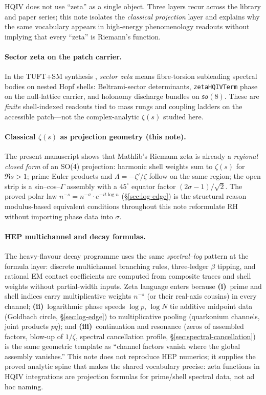 \documentclass[11pt]{amsart}
\begin{document}
HQIV does not use ``zeta'' as a single object.  Three layers recur across the
library and paper series; this note isolates the \emph{classical projection}
layer and explains why the same vocabulary appears in high-energy phenomenology
readouts without implying that every ``zeta'' is Riemann's function.

\paragraph{Sector zeta on the patch carrier.}
In the TUFT+SM synthesis \cite{hqiv-tuft-sm-lagrangian-paper}, \emph{sector
zeta} means fibre-torsion subleading spectral bodies on nested Hopf shells:
Beltrami-sector determinants, \texttt{zetaHQIVTerm} phase on the null-lattice
carrier, and holonomy discharge bundles on $\mathfrak{so}(8)$.  These are
\emph{finite} shell-indexed readouts tied to mass rungs and coupling ladders on
the accessible patch---not the complex-analytic $\zeta(s)$ studied here.

\paragraph{Classical $\zeta(s)$ as projection geometry (this note).}
The present manuscript shows that Mathlib's Riemann zeta is already a
\emph{regional closed form} of an SO(4) projection: harmonic shell weights sum
to $\zeta(s)$ for $\Re s>1$; prime Euler products and $\Lambda=-\zeta'/\zeta$
follow on the same region; the open strip is a sin--cos--$\Gamma$ assembly with
a $45^\circ$ equator factor $(2\sigma-1)/\sqrt2$.  The proved polar law
$n^{-s}=n^{-\sigma}\cdot e^{-it\log n}$ (\S\ref{sec:log-edge}) is the
structural reason modulus-based equivalent conditions throughout this note
reformulate RH
without importing phase data into $\sigma$.

\paragraph{HEP multichannel and decay formulas.}
The heavy-flavour decay programme \cite{hqiv-hep-decay-paper} uses the same
\emph{spectral--log} pattern at the formula layer: discrete multichannel
branching rules, three-ledger $\beta$ tipping, and rational EM contact
coefficients are computed from composite traces and shell weights without
partial-width inputs.  Zeta language enters because \textbf{(i)}~prime and
shell indices carry multiplicative weights $n^{-s}$ (or their real-axis
cousins) in every channel; \textbf{(ii)}~logarithmic phase speeds $\log p$,
$\log N$ tie additive midpoint data (Goldbach circle, \S\ref{sec:log-edge}) to
multiplicative pooling (quarkonium channels, joint products $pq$); and
\textbf{(iii)}~continuation and resonance (zeros of assembled factors, blow-up
of $1/\zeta$, spectral cancellation profile, \S\ref{sec:spectral-cancellation})
is the same geometric template as ``channel factors vanish where the global
assembly vanishes.''  This note does not reproduce HEP numerics; it supplies
the proved analytic spine that makes the shared vocabulary precise: zeta
functions in HQIV integrations are projection formulas for prime/shell spectral
data, not ad hoc naming.
\end{document}
